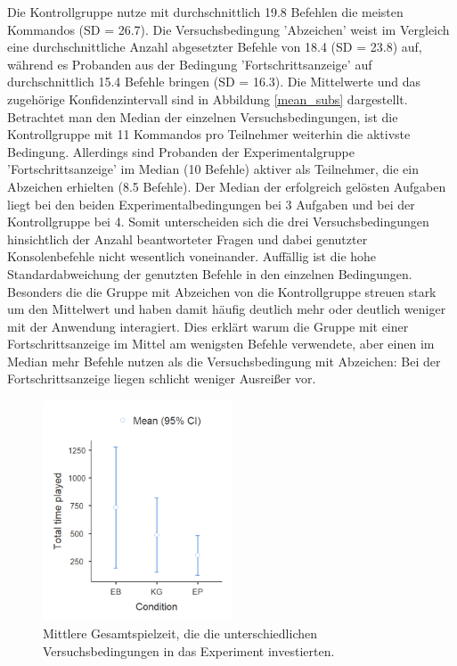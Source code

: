 Die Kontrollgruppe nutze mit durchschnittlich 19.8 Befehlen die meisten Kommandos (SD = 26.7). Die Versuchsbedingung 'Abzeichen' weist im Vergleich eine durchschnittliche Anzahl abgesetzter Befehle von 18.4 (SD = 23.8) auf, während es Probanden aus der Bedingung 'Fortschrittsanzeige' auf durchschnittlich 15.4 Befehle bringen (SD = 16.3). Die Mittelwerte und das zugehörige Konfidenzintervall sind in Abbildung \ref{mean_subs} dargestellt. Betrachtet man den Median der einzelnen Versuchsbedingungen, ist die Kontrollgruppe mit 11 Kommandos pro Teilnehmer weiterhin die aktivste Bedingung. Allerdings sind Probanden der Experimentalgruppe 'Fortschrittsanzeige' im Median (10 Befehle) aktiver als Teilnehmer, die ein Abzeichen erhielten (8.5 Befehle). Der Median der erfolgreich gelösten Aufgaben liegt bei den beiden Experimentalbedingungen bei 3 Aufgaben und bei der Kontrollgruppe bei 4. Somit unterscheiden sich die drei Versuchsbedingungen hinsichtlich der Anzahl beantworteter Fragen und dabei genutzter Konsolenbefehle nicht wesentlich voneinander. Auffällig ist die hohe Standardabweichung der genutzten Befehle in den einzelnen Bedingungen. Besonders die die Gruppe mit Abzeichen von die Kontrollgruppe streuen stark um den Mittelwert und haben damit häufig deutlich mehr oder deutlich weniger mit der Anwendung interagiert. Dies erklärt warum die Gruppe mit einer Fortschrittsanzeige im Mittel am wenigsten Befehle verwendete, aber einen im Median mehr Befehle nutzen als die Versuchsbedingung mit Abzeichen: Bei der Fortschrittsanzeige liegen schlicht weniger Ausreißer vor.  

\begin{figure}[htbp]
    \centering
    \includegraphics[width=0.5\textwidth]{img/auswertung/mean_time.png}
    \caption{Mittlere Gesamtspielzeit, die die unterschiedlichen Versuchsbedingungen in das Experiment investierten.}
    \label{mean_time}
\end{figure}

